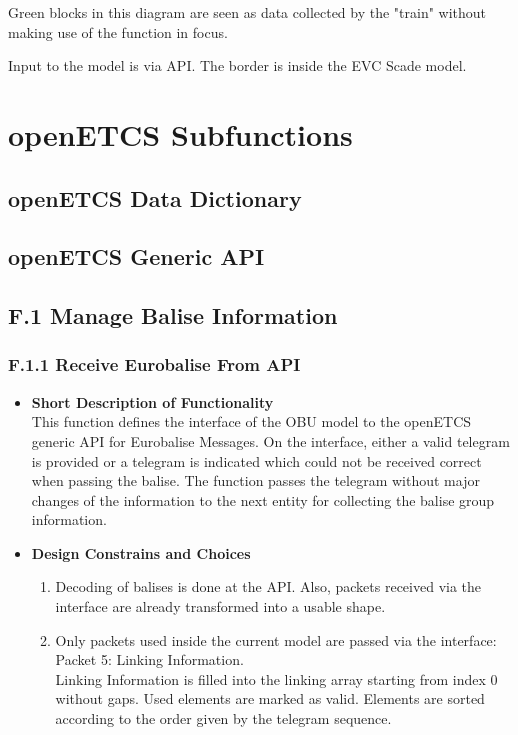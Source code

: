 \documentclass{template/openetcs_article}
\begin{document}
Green blocks in this diagram are seen as data collected by the "train" without making use of the function in focus.

Input to the model is via API. The border is inside the EVC Scade model. 

\section{openETCS Subfunctions}


\subsection{openETCS Data Dictionary}



\subsection{openETCS Generic API}



\subsection{F.1 Manage Balise Information}


\subsubsection{F.1.1 Receive Eurobalise From API}
\begin{itemize}
	\item \textbf{Short Description of Functionality}\\
	This function defines the interface of the OBU model to the openETCS generic API for Eurobalise Messages. On the interface, either a valid telegram is provided or a telegram is indicated which could not be received correct when passing the balise. The function passes the telegram without major changes of the information to the next entity for collecting the balise group information.
	
	\item \textbf{Design Constrains and Choices}\\
	\begin{enumerate}
		\item Decoding of balises is done at the API. Also, packets received via the interface are already transformed into a usable shape.
		\item Only packets used inside the current model are passed via the interface:\\
		Packet 5: Linking Information.\\
		Linking Information is filled into the linking array starting from index 0 without gaps. Used elements are marked as valid. Elements are sorted according to the order given by the telegram sequence.
	\end{enumerate}
\end{itemize}
\end{document}

